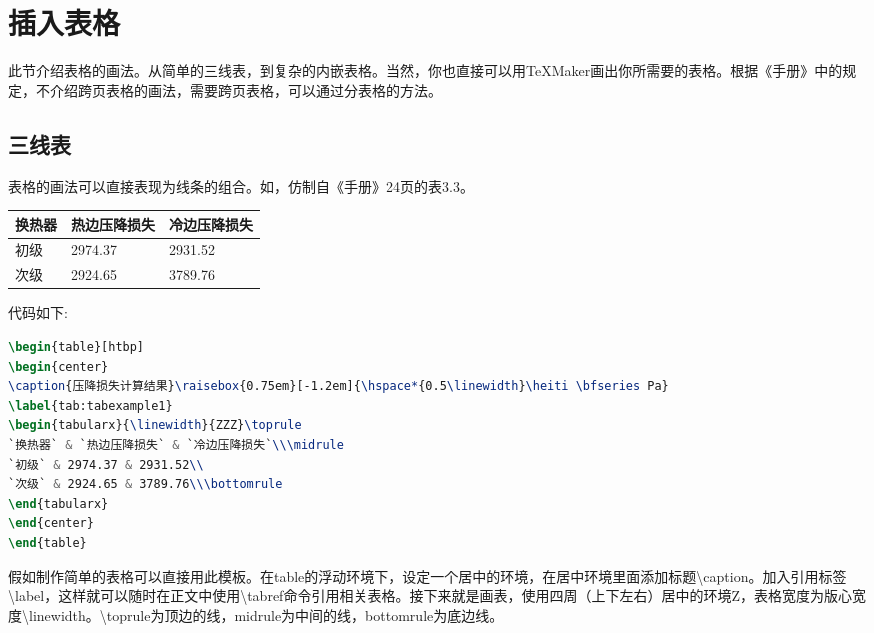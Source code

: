 \section{插入表格}
此节介绍表格的画法。从简单的三线表，到复杂的内嵌表格。当然，你也直接可以用\TeX{}Maker画出你所需要的表格。根据《手册》中的规定，不介绍跨页表格的画法，需要跨页表格，可以通过分表格的方法。

\subsection{三线表}
表格的画法可以直接表现为线条的组合。如，仿制自《手册》24页的表3.3。

\begin{table}[htbp]
\begin{center}
\label{tab:tabexample1}
\begin{tabularx}{\linewidth}{ZZZ}\toprule
换热器 & 热边压降损失 & 冷边压降损失\\\midrule
初级 & 2974.37 & 2931.52\\
次级 & 2924.65 & 3789.76\\\bottomrule
\end{tabularx}
\end{center}
\end{table}

代码如下:

\begin{lstlisting}[language=TeX]
\begin{table}[htbp]
\begin{center}
\caption{压降损失计算结果}\raisebox{0.75em}[-1.2em]{\hspace*{0.5\linewidth}\heiti \bfseries Pa}
\label{tab:tabexample1}
\begin{tabularx}{\linewidth}{ZZZ}\toprule
`换热器` & `热边压降损失` & `冷边压降损失`\\\midrule
`初级` & 2974.37 & 2931.52\\
`次级` & 2924.65 & 3789.76\\\bottomrule
\end{tabularx}
\end{center}
\end{table}
\end{lstlisting}

假如制作简单的表格可以直接用此模板。在table的浮动环境下，设定一个居中的环境，在居中环境里面添加标题\textbackslash caption。加入引用标签\textbackslash label，这样就可以随时在正文中使用\textbackslash tabref命令引用相关表格。接下来就是画表，使用四周（上下左右）居中的环境Z，表格宽度为版心宽度\textbackslash linewidth。\textbackslash toprule为顶边的线，midrule为中间的线，bottomrule为底边线。

